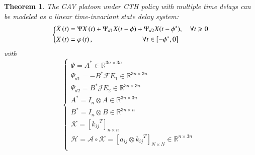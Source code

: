 \documentclass[journal]{IEEEtran}
\newtheorem{theorem}{Theorem}
\begin{document}
\begin{theorem}
  The CAV platoon under CTH policy with multiple time delays can be modeled as a linear time-invariant state delay system:
  \begin{equation}
    \left\{ \begin{gathered}
      \dot X\left( t \right) = \Psi X\left( t \right) + {\Psi _{d1}}X(t - \phi ) + {\Psi _{d2}}X(t - {\phi ^*}),\quad \forall t \geqslant 0 \hfill \\
      X\left( t \right) = \varphi \left( t \right),\quad \quad \quad \quad \quad \quad \quad \forall t \in \left[ { - {\phi ^*},0} \right] \hfill \\
    \end{gathered}  \right.
    \label{eq13}
  \end{equation}
  with
  \begin{equation}
    \left\{ {\begin{array}{*{20}{l}}
          {\Psi  = {A^*} \in {\mathbb{R}^{3n \times 3n}}}                                                                                                                                     \\
          {{\Psi _{d1}} =  - {B^*}\mathcal{F}{E_1} \in {\mathbb{R}^{3n \times 3n}}{\text{ }}}                                                                                                 \\
          {{\Psi _{d2}} = {B^*}\mathcal{J}{E_2} \in {\mathbb{R}^{3n \times 3n}}{\text{ }}}                                                                                                    \\
          {{A^*} = {I_n} \otimes A \in {\mathbb{R}^{3n \times 3n}}}                                                                                                                           \\
          {{B^*} = {I_n} \otimes B \in {\mathbb{R}^{3n \times n}}}                                                                                                                            \\
          {\mathcal{K} = {{[{k_{ij}}^T]}_{n \times n}}{\text{ }}}                                                                                                                             \\
          {\mathcal{H} = {\mathcal{A} \circ }\mathcal{K} = {{[{a_{ij}} \otimes {k_{ij}}^T]}_{N \times N}} \in {\mathbb{R}^{n \times 3n}}{\text{ }}}                                           \\

\end{array}}
\end{equation}
\end{theorem}
\end{document}

